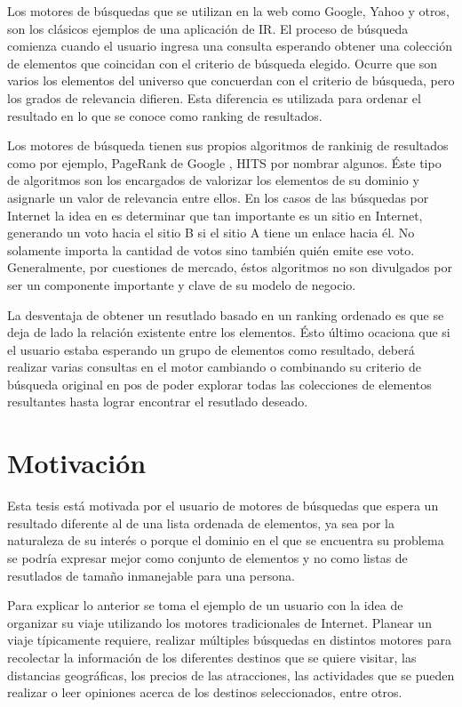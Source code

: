 Los motores de búsquedas que se utilizan en la web como Google, Yahoo y otros, son los clásicos ejemplos de una aplicación de IR. El proceso de búsqueda comienza cuando el usuario ingresa una consulta esperando obtener una colección de elementos que coincidan con el criterio de búsqueda elegido. Ocurre que son varios los elementos del universo que concuerdan con el criterio de búsqueda, pero los grados de relevancia difieren. Esta diferencia es utilizada para ordenar el resultado en lo que se conoce como ranking de resultados.

Los motores de búsqueda tienen sus propios algoritmos de rankinig de resultados como por ejemplo, PageRank de Google \cite{Brin:1998:ALH:297810.297827}, HITS \cite{Kleinberg:1999:ASH:324133.324140} por nombrar algunos. Éste tipo de algoritmos son los encargados de valorizar los elementos de su dominio y asignarle un valor de relevancia entre ellos. En los casos de las búsquedas por Internet la idea en \cite{Brin:1998:ALH:297810.297827} es determinar que tan importante es un sitio en Internet, generando un voto hacia el sitio B si el sitio A tiene un enlace hacia él. No solamente importa la cantidad de votos sino también quién emite ese voto. Generalmente, por cuestiones de mercado, éstos algoritmos no son divulgados por ser un componente importante y clave de su modelo de negocio. 

La desventaja de obtener un resutlado basado en un ranking ordenado es que se deja de lado la relación existente entre los elementos. Ésto último ocaciona que si el usuario estaba esperando un grupo de elementos como resultado, deberá realizar varias consultas en el motor cambiando o combinando su criterio de búsqueda original en pos de poder explorar todas las colecciones de elementos resultantes hasta lograr encontrar el resutlado deseado.

\section{Motivación}
Esta tesis está motivada por el usuario de motores de búsquedas que espera un resultado diferente al de una lista ordenada de elementos, ya sea por la naturaleza de su interés o porque el dominio en el que se encuentra su problema se podría expresar mejor como conjunto de elementos y no como listas de resutlados de tamaño inmanejable para una persona.

Para explicar lo anterior se toma el ejemplo de un usuario con la idea de organizar su viaje utilizando los motores tradicionales de Internet. Planear un viaje típicamente requiere, realizar múltiples búsquedas en distintos motores para recolectar la información de los diferentes destinos que se quiere visitar, las distancias geográficas, los precios de las atracciones, las actividades que se pueden realizar o leer opiniones acerca de los destinos seleccionados, entre otros.

